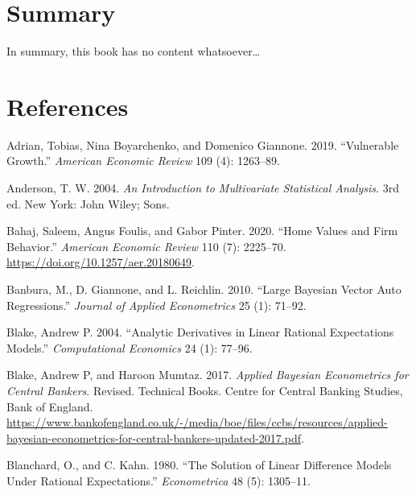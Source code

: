 \documentclass[
  letterpaper,
]{book}
\newlength{\cslhangindent}
\newlength{\cslentryspacingunit} %
\newenvironment{CSLReferences}[2] %
 {%
  \setlength{\parindent}{0pt}
  \ifodd #1
  \let\oldpar\par
  \def\par{\hangindent=\cslhangindent\oldpar}
  \fi
  \setlength{\parskip}{#2\cslentryspacingunit}
 }%
 {}
\begin{document}
\hypertarget{summary}{%
\chapter{Summary}\label{summary}}

In summary, this book has no content whatsoever\ldots{}

\hypertarget{references}{%
\chapter*{References}\label{references}}


\hypertarget{refs}{}
\begin{CSLReferences}{1}{0}
\leavevmode{}%
Adrian, Tobias, Nina Boyarchenko, and Domenico Giannone. 2019.
{``{Vulnerable Growth}.''} \emph{American Economic Review} 109 (4):
1263--89.

\leavevmode{}%
Anderson, T. W. 2004. \emph{An Introduction to Multivariate Statistical
Analysis}. 3rd ed. New York: John Wiley; Sons.

\leavevmode{}%
Bahaj, Saleem, Angus Foulis, and Gabor Pinter. 2020. {``Home Values and
Firm Behavior.''} \emph{American Economic Review} 110 (7): 2225--70.
\url{https://doi.org/10.1257/aer.20180649}.

\leavevmode{}%
Banbura, M., D. Giannone, and L. Reichlin. 2010. {``Large {B}ayesian
Vector Auto Regressions.''} \emph{Journal of Applied Econometrics} 25
(1): 71--92.

\leavevmode{}%
Blake, Andrew P. 2004. {``Analytic Derivatives in Linear Rational
Expectations Models.''} \emph{Computational Economics} 24 (1): 77--96.

\leavevmode{}%
Blake, Andrew P, and Haroon Mumtaz. 2017. \emph{Applied Bayesian
Econometrics for Central Bankers}. Revised. Technical Books. Centre for
Central Banking Studies, Bank of England.
\url{https://www.bankofengland.co.uk/-/media/boe/files/ccbs/resources/applied-bayesian-econometrics-for-central-bankers-updated-2017.pdf}.

\leavevmode{}%
Blanchard, O., and C. Kahn. 1980. {``The Solution of Linear Difference
Models Under Rational Expectations.''} \emph{Econometrica} 48 (5):
1305--11.


\end{CSLReferences}
\end{document}
